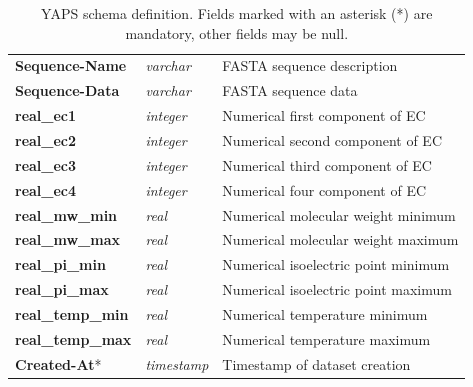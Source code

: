 \begin{table}[H]
\begin{tabular}{| l | l | l |}
\textbf{Sequence-Name} & \textit{varchar} & FASTA sequence description\\
\textbf{Sequence-Data} & \textit{varchar} & FASTA sequence data\\
\textbf{real\_ec1} & \textit{integer} & Numerical first component of EC\\
\textbf{real\_ec2} & \textit{integer} & Numerical second component of EC\\
\textbf{real\_ec3} & \textit{integer} & Numerical third component of EC\\
\textbf{real\_ec4} & \textit{integer} & Numerical four component of EC\\
\textbf{real\_mw\_min} & \textit{real} & Numerical molecular weight minimum\\
\textbf{real\_mw\_max} & \textit{real} & Numerical molecular weight maximum\\
\textbf{real\_pi\_min} & \textit{real} & Numerical isoelectric point minimum\\
\textbf{real\_pi\_max} & \textit{real} & Numerical isoelectric point maximum\\
\textbf{real\_temp\_min} & \textit{real} & Numerical temperature minimum\\
\textbf{real\_temp\_max} & \textit{real} & Numerical temperature maximum\\
\textbf{Created-At}* & \textit{timestamp} & Timestamp of dataset creation\\
\hline
\end{tabular}
\caption[YAPS schema]
        {YAPS schema definition. Fields marked with an asterisk (*)
         are mandatory, other fields may be null.}
\label{tab:yaps-schema}
\end{table}




